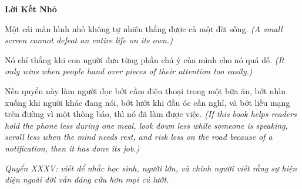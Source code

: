 \clearpage
\thispagestyle{empty}
\begin{center}
\vspace*{2cm}
{\fontsize{24}{30}\selectfont\bfseries\color{bookprimary} Lời Kết Nhỏ\par}
\vspace{1cm}

\begin{minipage}{0.82\textwidth}
\begin{tcolorbox}[colback=bookbg,colframe=booksecondary,arc=4pt,boxrule=0.8pt]
Một cái màn hình nhỏ không tự nhiên thắng được cả một đời sống.
\textit{(A small screen cannot defeat an entire life on its own.)}

Nó chỉ thắng khi con người đưa từng phần chú ý của mình cho nó quá dễ.
\textit{(It only wins when people hand over pieces of their attention too easily.)}

Nếu quyển này làm người đọc bớt cầm điện thoại trong một bữa ăn, bớt nhìn xuống khi người khác đang nói, bớt lướt khi đầu óc cần nghỉ, và bớt liều mạng trên đường vì một thông báo, thì nó đã làm được việc.
\textit{(If this book helps readers hold the phone less during one meal, look down less while someone is speaking, scroll less when the mind needs rest, and risk less on the road because of a notification, then it has done its job.)}
\end{tcolorbox}
\end{minipage}

\vfill
{\footnotesize\itshape\color{booksecondary} Quyển XXXV: viết để nhắc học sinh, người lớn, và chính người viết rằng sự hiện diện ngoài đời vẫn đáng cứu hơn mọi cú lướt.\par}
\end{center}